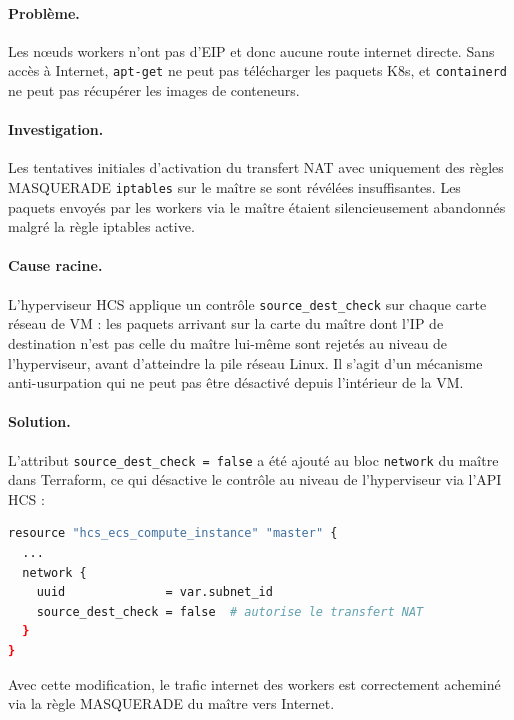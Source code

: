 \paragraph{Problème.}
Les nœuds workers n'ont pas d'EIP et donc aucune route internet directe. Sans accès
à Internet, \texttt{apt-get} ne peut pas télécharger les paquets K8s, et
\texttt{containerd} ne peut pas récupérer les images de conteneurs.

\paragraph{Investigation.}
Les tentatives initiales d'activation du transfert NAT avec uniquement des règles
MASQUERADE \texttt{iptables} sur le maître se sont révélées insuffisantes. Les paquets
envoyés par les workers via le maître étaient silencieusement abandonnés malgré la
règle iptables active.

\paragraph{Cause racine.}
L'hyperviseur HCS applique un contrôle \texttt{source\_dest\_check} sur chaque carte
réseau de VM : les paquets arrivant sur la carte du maître dont l'IP de destination
n'est pas celle du maître lui-même sont rejetés au niveau de l'hyperviseur, avant
d'atteindre la pile réseau Linux. Il s'agit d'un mécanisme anti-usurpation qui ne
peut pas être désactivé depuis l'intérieur de la VM.

\paragraph{Solution.}
L'attribut \texttt{source\_dest\_check = false} a été ajouté au bloc \texttt{network}
du maître dans Terraform, ce qui désactive le contrôle au niveau de l'hyperviseur via
l'API HCS :

\begin{lstlisting}[language=bash, caption={Terraform : désactivation de source\_dest\_check sur la carte réseau du maître},
                   label={lst:sdc}]
resource "hcs_ecs_compute_instance" "master" {
  ...
  network {
    uuid              = var.subnet_id
    source_dest_check = false  # autorise le transfert NAT
  }
}
\end{lstlisting}

Avec cette modification, le trafic internet des workers est correctement acheminé
via la règle MASQUERADE du maître vers Internet.

